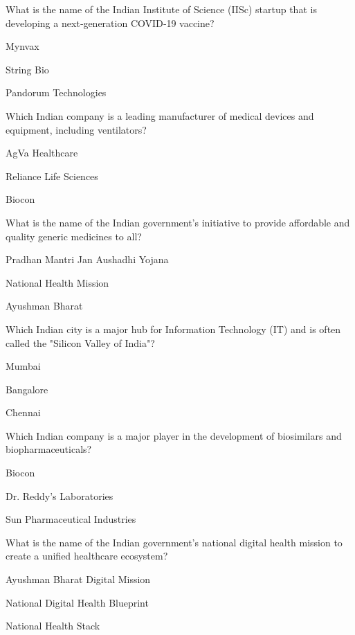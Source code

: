 \begin{enhancedmcq}{What is the name of the Indian Institute of Science (IISc) startup that is developing a next‑generation COVID‑19 vaccine?}
\item Mynvax
\item String Bio
\item Pandorum Technologies

\end{enhancedmcq}
\begin{enhancedmcq}{Which Indian company is a leading manufacturer of medical devices and equipment, including ventilators?}
\item AgVa Healthcare
\item Reliance Life Sciences
\item Biocon

\end{enhancedmcq}
\begin{enhancedmcq}{What is the name of the Indian government's initiative to provide affordable and quality generic medicines to all?}
\item Pradhan Mantri Jan Aushadhi Yojana
\item National Health Mission
\item Ayushman Bharat

\end{enhancedmcq}
\begin{enhancedmcq}{Which Indian city is a major hub for Information Technology (IT) and is often called the "Silicon Valley of India"?}
\item Mumbai
\item Bangalore
\item Chennai

\end{enhancedmcq}
\begin{enhancedmcq}{Which Indian company is a major player in the development of biosimilars and biopharmaceuticals?}
\item Biocon
\item Dr. Reddy's Laboratories
\item Sun Pharmaceutical Industries

\end{enhancedmcq}
\begin{enhancedmcq}{What is the name of the Indian government's national digital health mission to create a unified healthcare ecosystem?}
\item Ayushman Bharat Digital Mission
\item National Digital Health Blueprint
\item National Health Stack

\end{enhancedmcq}
